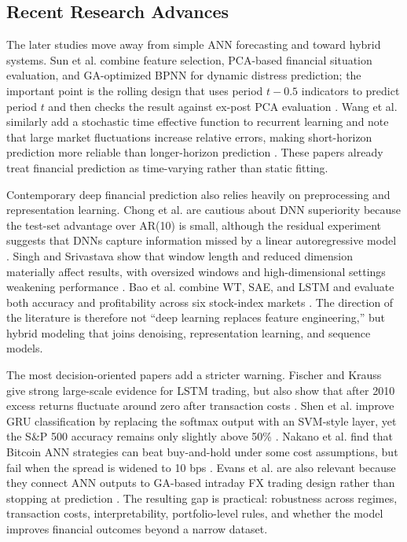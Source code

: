 \documentclass[conference]{IEEEtran}
\begin{document}
\subsection{Recent Research Advances}
The later studies move away from simple ANN forecasting and toward hybrid systems. Sun et al. combine feature selection, PCA-based financial situation evaluation, and GA-optimized BPNN for dynamic distress prediction; the important point is the rolling design that uses period $t-0.5$ indicators to predict period $t$ and then checks the result against ex-post PCA evaluation \cite{sun2011sffs}. Wang et al. similarly add a stochastic time effective function to recurrent learning and note that large market fluctuations increase relative errors, making short-horizon prediction more reliable than longer-horizon prediction \cite{wang2016elman}. These papers already treat financial prediction as time-varying rather than static fitting.

Contemporary deep financial prediction also relies heavily on preprocessing and representation learning. Chong et al. are cautious about DNN superiority because the test-set advantage over AR(10) is small, although the residual experiment suggests that DNNs capture information missed by a linear autoregressive model \cite{chong2017deep}. Singh and Srivastava show that window length and reduced dimension materially affect results, with oversized windows and high-dimensional settings weakening performance \cite{singh2017stock}. Bao et al. combine WT, SAE, and LSTM and evaluate both accuracy and profitability across six stock-index markets \cite{bao2017deep}. The direction of the literature is therefore not ``deep learning replaces feature engineering,'' but hybrid modeling that joins denoising, representation learning, and sequence models.

The most decision-oriented papers add a stricter warning. Fischer and Krauss give strong large-scale evidence for LSTM trading, but also show that after 2010 excess returns fluctuate around zero after transaction costs \cite{fischer2018deep}. Shen et al. improve GRU classification by replacing the softmax output with an SVM-style layer, yet the S\&P 500 accuracy remains only slightly above 50\% \cite{shen2018gru}. Nakano et al. find that Bitcoin ANN strategies can beat buy-and-hold under some cost assumptions, but fail when the spread is widened to 10 bps \cite{nakano2018bitcoin}. Evans et al. are also relevant because they connect ANN outputs to GA-based intraday FX trading design rather than stopping at prediction \cite{evans2013utilizing}. The resulting gap is practical: robustness across regimes, transaction costs, interpretability, portfolio-level rules, and whether the model improves financial outcomes beyond a narrow dataset.
\end{document}
